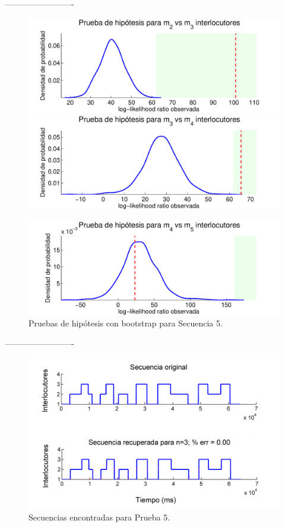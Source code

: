 -------------------------

\begin{figure}[H]
  \centerline  
  {\includegraphics[width=0.7\linewidth]{gfx/chap6/caldboot1}
   \includegraphics[width=0.7\linewidth]{gfx/chap6/caldboot2} }
  \centerline  
  {\includegraphics[width=0.7\linewidth]{gfx/chap6/caldboot3}
   \hspace{0.6\linewidth}
  } \quad
  \caption{Pruebas de hipótesis con bootstrap para Secuencia 5.}
  \label{fig:prb1_boot}
\end{figure}

-------------------------

\begin{figure}[H]
  \centerline
  {\includegraphics[width=0.8\linewidth]{gfx/chap6/noct1_}} \quad
  \caption{Secuencias encontradas para Prueba 5.}
  \label{fig:prb1_seq}
\end{figure}

